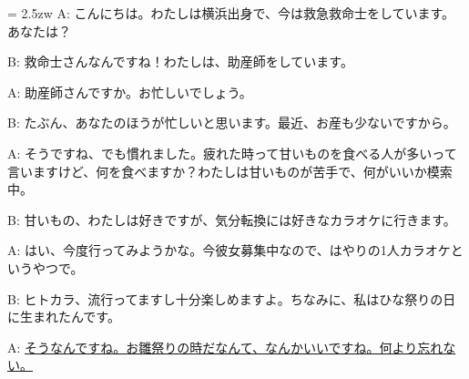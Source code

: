 \documentclass[11pt]{amsart}
\title{}
\author{}
\newenvironment{hangall}[1]{\hangindent = 2.5zw\everypar{\hangindent = 2.5zw}}{}
\begin{document}
\maketitle
\begin{hangall}{}%
A: こんにちは。わたしは横浜出身で、今は救急救命士をしています。あなたは？

B: 救命士さんなんですね！わたしは、助産師をしています。

A: 助産師さんですか。お忙しいでしょう。

B: たぶん、あなたのほうが忙しいと思います。最近、お産も少ないですから。

A: そうですね、でも慣れました。疲れた時って甘いものを食べる人が多いって言いますけど、何を食べますか？わたしは甘いものが苦手で、何がいいか模索中。

B: 甘いもの、わたしは好きですが、気分転換には好きなカラオケに行きます。

A: はい、今度行ってみようかな。今彼女募集中なので、はやりの1人カラオケというやつで。

B: ヒトカラ、流行ってますし十分楽しめますよ。ちなみに、私はひな祭りの日に生まれたんです。

A: \ul{そうなんですね。お雛祭りの時だなんて、なんかいいですね。何より忘れない。}\end{hangall}
\end{document}
